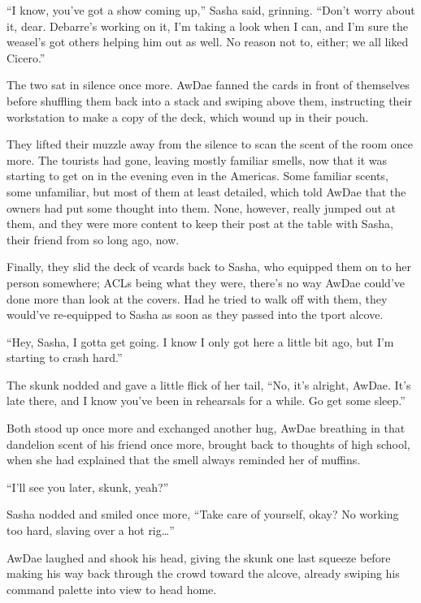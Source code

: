 ``I know, you've got a show coming up,'' Sasha said, grinning.  ``Don't worry about it, dear.  Debarre's working on it, I'm taking a look when I can, and I'm sure the weasel's got others helping him out as well.  No reason not to, either; we all liked Cicero.''

The two sat in silence once more.  AwDae fanned the cards in front of themselves before shuffling them back into a stack and swiping above them, instructing their workstation to make a copy of the deck, which wound up in their pouch.

They lifted their muzzle away from the silence to scan the scent of the room once more.  The tourists had gone, leaving mostly familiar smells, now that it was starting to get on in the evening even in the Americas.  Some familiar scents, some unfamiliar, but most of them at least detailed, which told AwDae that the owners had put some thought into them.  None, however, really jumped out at them, and they were more content to keep their post at the table with Sasha, their friend from so long ago, now.

Finally, they slid the deck of vcards back to Sasha, who equipped them on to her person somewhere; ACLs being what they were, there's no way AwDae could've done more than look at the covers.  Had he tried to walk off with them, they would've re-equipped to Sasha as soon as they passed into the tport alcove.

``Hey, Sasha, I gotta get going.  I know I only got here a little bit ago, but I'm starting to crash hard.''

The skunk nodded and gave a little flick of her tail, ``No, it's alright, AwDae.  It's late there, and I know you've been in rehearsals for a while.  Go get some sleep.''

Both stood up once more and exchanged another hug, AwDae breathing in that dandelion scent of his friend once more, brought back to thoughts of high school, when she had explained that the smell always reminded her of muffins.

``I'll see you later, skunk, yeah?''

Sasha nodded and smiled once more, ``Take care of yourself, okay?  No working too hard, slaving over a hot rig\ldots{}''

AwDae laughed and shook his head, giving the skunk one last squeeze before making his way back through the crowd toward the alcove, already swiping his command palette into view to head home.
